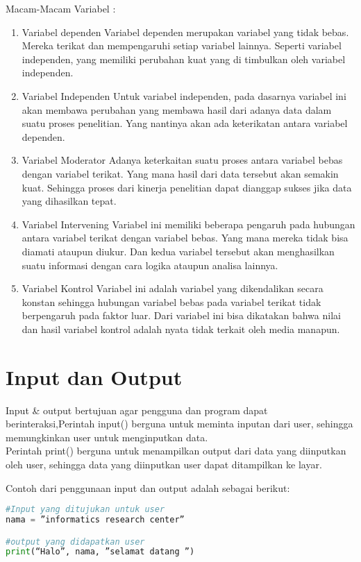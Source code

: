 Macam-Macam Variabel :
\begin{enumerate}
    \item Variabel dependen
Variabel dependen merupakan variabel yang tidak bebas. Mereka terikat dan mempengaruhi setiap variabel lainnya. Seperti variabel independen, yang memiliki perubahan kuat yang di timbulkan oleh variabel independen.

    \item Variabel Independen
Untuk variabel independen, pada dasarnya variabel ini akan membawa perubahan yang membawa hasil dari adanya data dalam suatu proses penelitian. Yang nantinya akan ada keterikatan antara variabel dependen.

    \item Variabel Moderator
Adanya keterkaitan suatu proses antara variabel bebas dengan variabel terikat. Yang mana hasil dari data tersebut akan semakin kuat. Sehingga proses dari kinerja penelitian dapat dianggap sukses jika data yang dihasilkan tepat.

    \item Variabel Intervening
Variabel ini memiliki beberapa pengaruh pada hubungan antara variabel terikat dengan variabel bebas. Yang mana mereka tidak bisa diamati ataupun diukur. Dan kedua variabel tersebut akan menghasilkan suatu informasi dengan cara logika ataupun analisa lainnya.

    \item Variabel Kontrol
Variabel ini adalah variabel yang dikendalikan secara konstan sehingga hubungan variabel bebas pada variabel terikat tidak berpengaruh pada faktor luar. Dari variabel ini bisa dikatakan bahwa nilai dan hasil variabel kontrol adalah nyata tidak terkait oleh media manapun.
\end{enumerate}

\section{Input dan Output}
Input \& output bertujuan agar pengguna dan program dapat berinteraksi,Perintah input() berguna untuk meminta inputan dari user, sehingga memungkinkan user untuk menginputkan data.\\
Perintah print() berguna untuk menampilkan output dari data yang diinputkan oleh user, sehingga data yang diinputkan user dapat ditampilkan ke layar.
\par
Contoh dari penggunaan input dan output adalah sebagai berikut:
\begin{lstlisting}[language=Python]
#Input yang ditujukan untuk user
nama = ”informatics research center” 

#output yang didapatkan user
print(“Halo”, nama, ”selamat datang ”)
\end{lstlisting}

